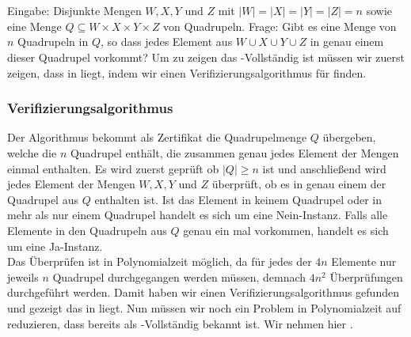 \documentclass[a4paper]{article}
\begin{document}
	\maketitle
	\section{}
		\subsection{\fourdmatching}
			Eingabe: Disjunkte Mengen $W,X,Y$ und $Z$ mit $|W| = |X| = |Y| = |Z| = n$ sowie eine Menge $Q\subseteq W \times X \times Y \times Z$ von Quadrupeln.\n
			Frage: Gibt es eine Menge von $n$ Quadrupeln in $Q$, so dass jedes Element aus $W\cup X\cup Y\cup Z$ in genau einem dieser Quadrupel vorkommt?\n
			Um zu zeigen das \fourdmatching \np-Vollständig ist müssen wir zuerst zeigen, dass \fourdmatching in \np liegt, indem wir einen Verifizierungsalgorithmus für \fourdmatching finden.
			\subsubsection*{Verifizierungsalgorithmus}
			Der Algorithmus bekommt als Zertifikat die Quadrupelmenge $Q$ übergeben, welche die $n$ Quadrupel enthält, die zusammen genau jedes Element der Mengen einmal enthalten. Es wird zuerst geprüft ob $|Q|\geq n$ ist und anschließend wird jedes Element der Mengen $W,X,Y$ und $Z$ überprüft, ob es in genau einem der Quadrupel aus $Q$ enthalten ist. Ist das Element in keinem Quadrupel oder in mehr als nur einem Quadrupel handelt es sich um eine Nein-Instanz. Falls alle Elemente in den Quadrupeln aus $Q$ genau ein mal vorkommen, handelt es sich um eine Ja-Instanz.\\
			Das Überprüfen ist in Polynomialzeit möglich, da für jedes der $4n$ Elemente nur jeweils $n$ Quadrupel durchgegangen werden müssen, demnach $4n^2$ Überprüfungen durchgeführt werden.\n
			Damit haben wir einen Verifizierungsalgorithmus gefunden und gezeigt das \fourdmatching in \np liegt. Nun müssen wir noch ein Problem in Polynomialzeit auf \fourdmatching reduzieren, dass bereits als \np-Vollständig bekannt ist. Wir nehmen hier \threedmatching.
\end{document}
